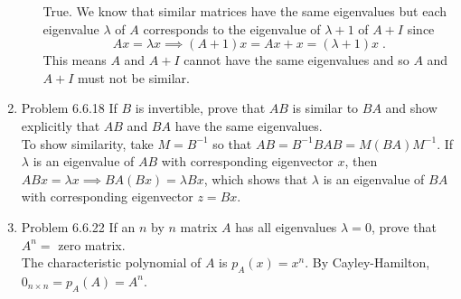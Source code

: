 \documentclass[a4paper]{article}
\begin{document}
\begin{enumerate}
\begin{enumerate}
	True. We know that similar matrices have the same eigenvalues
	but each eigenvalue $\lambda$ of $A$ corresponds to the 
	eigenvalue of $\lambda + 1$ of $A+I$ since
	$$
	Ax = \lambda x \implies (A+1)x = Ax + x = (\lambda+1)x \;.
	$$
	This means $A$ and $A+I$ cannot have the same eigenvalues and
	so $A$ and $A+I$ must not be similar.
\end{enumerate}

\item{Problem 6.6.18} If $B$ is invertible, prove that $AB$ is similar to $BA$ and show explicitly that $AB$ and $BA$ have the
same eigenvalues. \\

To show similarity, take $M = B^{-1}$  so that $AB = B^{-1}BAB = M(BA)M^{-1}$. If $\lambda$ is an eigenvalue of $AB$ with corresponding eigenvector $x$, then
$ABx = \lambda x \implies BA(Bx) = \lambda Bx$, which shows that $\lambda$ is an eigenvalue of $BA$ with corresponding eigenvector $z = Bx$. 

\item{Problem 6.6.22} If an $n$ by $n$ matrix $A$ has all eigenvalues $\lambda = 0$, prove that $A^n = $ zero matrix. \\

The characteristic polynomial of $A$ is $p_A(x) = x^n$. By Cayley-Hamilton, $0_{n\times n} = p_A(A) = A^n$. 
\end{enumerate}

\newpage
\end{document}
